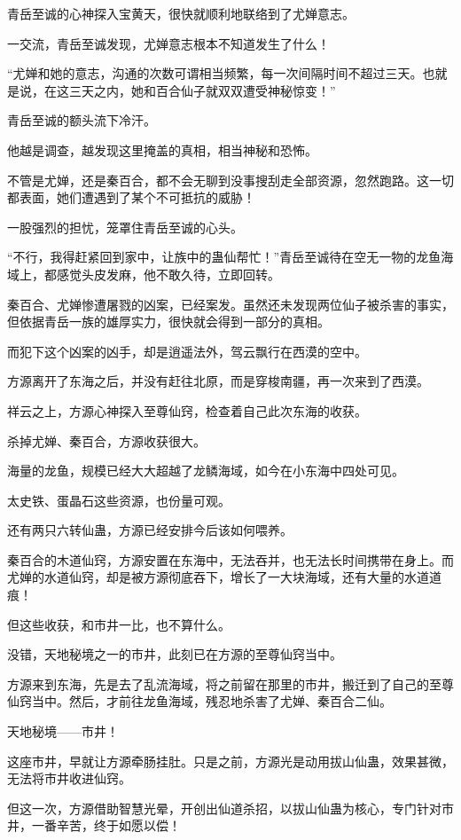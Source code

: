 \begin{this_body}
青岳至诚的心神探入宝黄天，很快就顺利地联络到了尤婵意志。

一交流，青岳至诚发现，尤婵意志根本不知道发生了什么！

“尤婵和她的意志，沟通的次数可谓相当频繁，每一次间隔时间不超过三天。也就是说，在这三天之内，她和百合仙子就双双遭受神秘惊变！”

青岳至诚的额头流下冷汗。

他越是调查，越发现这里掩盖的真相，相当神秘和恐怖。

不管是尤婵，还是秦百合，都不会无聊到没事搜刮走全部资源，忽然跑路。这一切都表面，她们遭遇到了某个不可抵抗的威胁！

一股强烈的担忧，笼罩住青岳至诚的心头。

“不行，我得赶紧回到家中，让族中的蛊仙帮忙！”青岳至诚待在空无一物的龙鱼海域上，都感觉头皮发麻，他不敢久待，立即回转。

秦百合、尤婵惨遭屠戮的凶案，已经案发。虽然还未发现两位仙子被杀害的事实，但依据青岳一族的雄厚实力，很快就会得到一部分的真相。

而犯下这个凶案的凶手，却是逍遥法外，驾云飘行在西漠的空中。

方源离开了东海之后，并没有赶往北原，而是穿梭南疆，再一次来到了西漠。

祥云之上，方源心神探入至尊仙窍，检查着自己此次东海的收获。

杀掉尤婵、秦百合，方源收获很大。

海量的龙鱼，规模已经大大超越了龙鳞海域，如今在小东海中四处可见。

太史铁、蛋晶石这些资源，也份量可观。

还有两只六转仙蛊，方源已经安排今后该如何喂养。

秦百合的木道仙窍，方源安置在东海中，无法吞并，也无法长时间携带在身上。而尤婵的水道仙窍，却是被方源彻底吞下，增长了一大块海域，还有大量的水道道痕！

但这些收获，和市井一比，也不算什么。

没错，天地秘境之一的市井，此刻已在方源的至尊仙窍当中。

方源来到东海，先是去了乱流海域，将之前留在那里的市井，搬迁到了自己的至尊仙窍当中。然后，才前往龙鱼海域，残忍地杀害了尤婵、秦百合二仙。

天地秘境——市井！

这座市井，早就让方源牵肠挂肚。只是之前，方源光是动用拔山仙蛊，效果甚微，无法将市井收进仙窍。

但这一次，方源借助智慧光晕，开创出仙道杀招，以拔山仙蛊为核心，专门针对市井，一番辛苦，终于如愿以偿！


\end{this_body}
